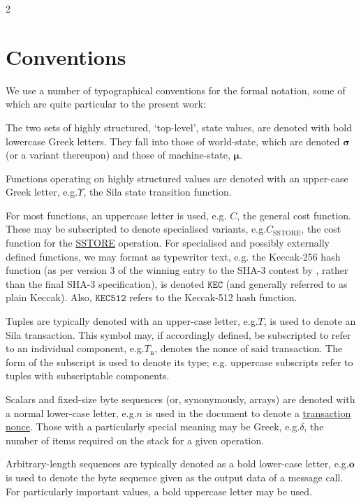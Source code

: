 \documentclass[9pt,oneside]{amsart}
\makeatletter
\newcommand*\eg{e.g.\@\xspace}
\makeatother
\begin{document}
\begin{multicols}{2}
\section{Conventions}\label{ch:conventions}

We use a number of typographical conventions for the formal notation, some of which are quite particular to the present work:

The two sets of highly structured, `top-level', state values, are denoted with bold lowercase Greek letters. They fall into those of world-state, which are denoted $\boldsymbol{\sigma}$ (or a variant thereupon) and those of machine-state, $\boldsymbol{\mu}$.

Functions operating on highly structured values are denoted with an upper-case Greek letter, \eg \hyperlink{Upsilon_state_transition}{$\Upsilon$}, the Sila state transition function.

For most functions, an uppercase letter is used, e.g. $C$, the general cost function. These may be subscripted to denote specialised variants, \eg \hyperlink{C__SSTORE}{$C_\text{SSTORE}$}, the cost function for the \hyperlink{SSTORE}{{\tiny SSTORE}} operation. For specialised and possibly externally defined functions, we may format as typewriter text, \eg the Keccak-256 hash function (as per version 3 of the winning entry to the SHA-3 contest by \cite{Keccak}, rather than the final SHA-3 specification), is denoted $\texttt{KEC}$ (and generally referred to as plain Keccak). Also, $\texttt{KEC512}$ refers to the Keccak-512 hash function.

Tuples are typically denoted with an upper-case letter, \eg $T$, is used to denote an Sila transaction. This symbol may, if accordingly defined, be subscripted to refer to an individual component, \eg \hyperlink{transaction_nonce}{$T_{\mathrm{n}}$}, denotes the nonce of said transaction. The form of the subscript is used to denote its type; \eg uppercase subscripts refer to tuples with subscriptable components.

Scalars and fixed-size byte sequences (or, synonymously, arrays) are denoted with a normal lower-case letter, \eg $n$ is used in the document to denote a \hyperlink{transaction_nonce}{transaction nonce}. Those with a particularly special meaning may be Greek, \eg $\delta$, the number of items required on the stack for a given operation.

Arbitrary-length sequences are typically denoted as a bold lower-case letter, \eg $\mathbf{o}$ is used to denote the byte sequence given as the output data of a message call. For particularly important values, a bold uppercase letter may be used.


\end{multicols}
\end{document}
